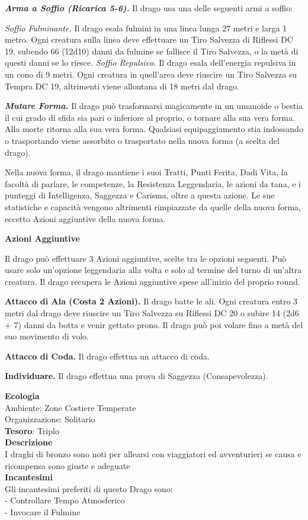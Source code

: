 \begin{multicols}{2}
\textit{\textbf{Arma a Soffio (Ricarica 5-6).}} Il drago usa una delle seguenti armi a soffio:

\textit{Soffio Fulminante.} Il drago esala fulmini in una linea lunga 27 metri e larga 1 metro. Ogni creatura sulla linea deve effettuare un Tiro Salvezza di Riflessi DC 19, subendo 66 (12d10) danni da fulmine se fallisce il Tiro Salvezza, o la metà di questi danni se lo riesce. \textit{Soffio Repulsivo.} Il drago esala dell'energia repulsiva in un cono di 9 metri. Ogni creatura in quell'area deve riuscire un Tiro Salvezza su Tempra DC 19, altrimenti viene allontana di 18 metri dal drago.

\textit{\textbf{Mutare Forma.}} Il drago può trasformarsi magicamente in un umanoide o bestia il cui grado di sfida sia pari o inferiore al proprio, o tornare alla sua vera forma. Alla morte ritorna alla sua vera forma. Qualsiasi equipaggiamento stia indossando o trasportando viene assorbito o trasportato nella nuova forma (a scelta del drago).

Nella nuova forma, il drago mantiene i suoi Tratti, Punti Ferita, Dadi Vita, la facoltà di parlare, le competenze, la Resistenza Leggendaria, le azioni da tana, e i punteggi di Intelligenza, Saggezza e Carisma, oltre a questa azione. Le sue statistiche e capacità vengono altrimenti rimpiazzate da quelle della nuova forma, eccetto Azioni aggiuntive della nuova forma.

\textbf{Azioni Aggiuntive}

Il drago può effettuare 3 Azioni aggiuntive, scelte tra le opzioni seguenti. Può usare solo un'opzione leggendaria alla volta e solo al termine del turno di un'altra creatura. Il drago recupera le Azioni aggiuntive spese all'inizio del proprio round.

\textbf{Attacco di Ala (Costa 2 Azioni).} Il drago batte le ali. Ogni creatura entro 3 metri dal drago deve riuscire un Tiro Salvezza su Riflessi DC 20 o subire 14 (2d6 + 7) danni da botta e venir gettato prono. Il drago può poi volare fino a metà del suo movimento di volo.

\textbf{Attacco di Coda.} Il drago effettua un attacco di coda.

\textbf{Individuare.} Il drago effettua una prova di Saggezza (Consapevolezza).

\textbf{Ecologia}\\
Ambiente: Zone Costiere Temperate\\
Organizzazione: Solitario\\
\textbf{Tesoro}: Triplo\\
\textbf{Descrizione}\\
I draghi di bronzo sono noti per allearsi con viaggiatori ed avventurieri se causa e ricompensa sono giuste e adeguate\\
\textbf{Incantesimi}\\
Gli incantesimi preferiti di questo Drago sono:\\
- Controllare Tempo Atmosferico\\
- Invocare il Fulmine



\end{multicols}
